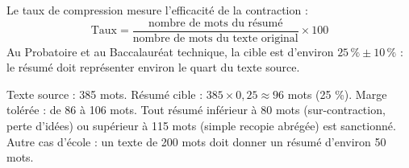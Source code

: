 \documentclass[11pt]{article}
\begin{document}
\begin{propriete}
Le taux de compression mesure l'efficacité de la contraction :
\[ \text{Taux} = \frac{\text{nombre de mots du résumé}}{\text{nombre de mots du texte original}} \times 100 \]
Au Probatoire et au Baccalauréat technique, la cible est d'environ $25\,\% \pm 10\,\%$ : le résumé doit représenter environ le quart du texte source.
\end{propriete}

\begin{exemplebox}
Texte source : 385 mots. Résumé cible : $385 \times 0{,}25 \approx 96$ mots (25 \%). Marge tolérée : de 86 à 106 mots. Tout résumé inférieur à 80 mots (sur-contraction, perte d'idées) ou supérieur à 115 mots (simple recopie abrégée) est sanctionné. Autre cas d'école : un texte de 200 mots doit donner un résumé d'environ 50 mots.
\end{exemplebox}
\end{document}
